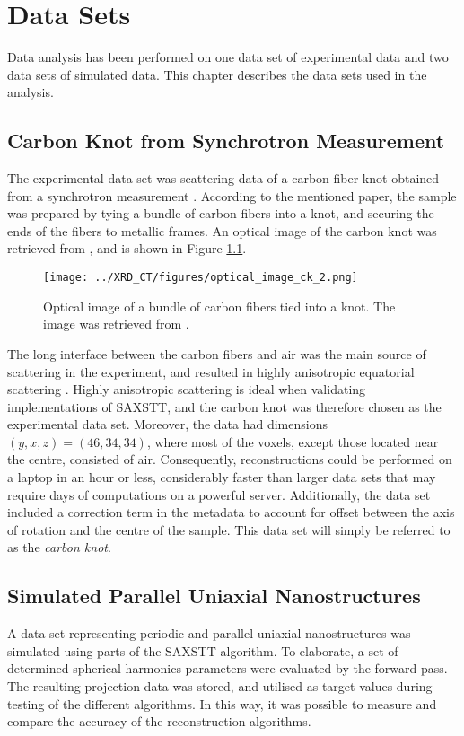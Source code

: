 \chapter{Data Sets} %
\label{ch:reconstruction_data_sets}

Data analysis has been performed on one data set of experimental data and two data sets of simulated data.
This chapter describes the data sets used in the analysis.

\section{Carbon Knot from Synchrotron Measurement} %
\label{sec:data_set_carbon_knot}
The experimental data set was scattering data of a carbon fiber knot obtained from a synchrotron measurement \cite{PMID_30821257}.
According to the mentioned paper, the sample was prepared by tying a bundle of carbon fibers into a knot, and securing the ends of the fibers to metallic frames.
An optical image of the carbon knot was retrieved from \cite{PMID_30821257}, and is shown in Figure \ref{fig:carbon_knot_image}.
\begin{figure}[htbp]
    \centering
    \texttt{[image: ../XRD\_CT/figures/optical\_image\_ck\_2.png]}
    \caption[Optical Image of Carbon Fiber Knot]{Optical image of a bundle of carbon fibers tied into a knot. The image was retrieved from \cite{PMID_30821257}.}
    \label{fig:carbon_knot_image}
\end{figure}
The long interface between the carbon fibers and air was the main source of scattering in the experiment, and resulted in highly anisotropic equatorial scattering \cite{PMID_30821257}.
Highly anisotropic scattering is ideal when validating implementations of SAXSTT, and the carbon knot was therefore chosen as the experimental data set.
Moreover, the data had dimensions $(y,x,z) = (46,34,34)$, where most of the voxels, except those located near the centre, consisted of air.
Consequently, reconstructions could be performed on a laptop in an hour or less, considerably faster than larger data sets that may require days of computations on a powerful server.   %
Additionally, the data set included a correction term in the metadata to account for offset between the axis of rotation
and the centre of the sample. This data set will simply be referred to as the \emph{carbon knot}.


\section{Simulated Parallel Uniaxial Nanostructures} %
\label{sec:reconstruction_data_sets_periodic_parallel_uniaxial_nanostructures}
A data set representing periodic and parallel uniaxial nanostructures was simulated using parts of the SAXSTT algorithm.
To elaborate, a set of determined spherical harmonics parameters were evaluated by the forward pass.
The resulting projection data was stored, and utilised as target values during testing of the different algorithms.
In this way, it was possible to measure and compare the accuracy of the reconstruction algorithms.

